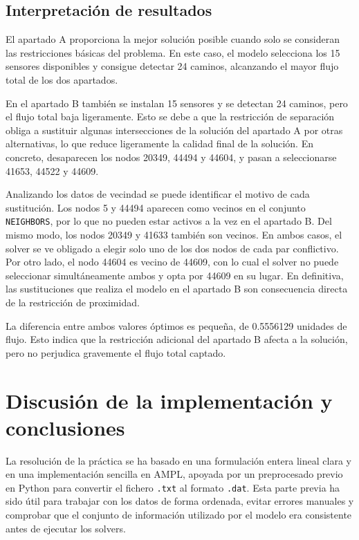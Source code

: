 \documentclass[12pt,a4paper]{article}
\begin{document}
\subsection{Interpretación de resultados}

El apartado A proporciona la mejor solución posible cuando solo se consideran las restricciones básicas del problema. En este caso, el modelo selecciona los 15 sensores disponibles y consigue detectar 24 caminos, alcanzando el mayor flujo total de los dos apartados.

En el apartado B también se instalan 15 sensores y se detectan 24 caminos, pero el flujo total baja ligeramente. Esto se debe a que la restricción de separación obliga a sustituir algunas intersecciones de la solución del apartado A por otras alternativas, lo que reduce ligeramente la calidad final de la solución. En concreto, desaparecen los nodos 20349, 44494 y 44604, y pasan a seleccionarse 41653, 44522 y 44609.

Analizando los datos de vecindad se puede identificar el motivo de cada sustitución. Los nodos 5 y 44494 aparecen como vecinos en el conjunto \texttt{NEIGHBORS}, por lo que no pueden estar activos a la vez en el apartado B. Del mismo modo, los nodos 20349 y 41633 también son vecinos. En ambos casos, el solver se ve obligado a elegir solo uno de los dos nodos de cada par conflictivo. Por otro lado, el nodo 44604 es vecino de 44609, con lo cual el solver no puede seleccionar simultáneamente ambos y opta por 44609 en su lugar. En definitiva, las sustituciones que realiza el modelo en el apartado B son consecuencia directa de la restricción de proximidad.

La diferencia entre ambos valores óptimos es pequeña, de 0.5556129 unidades de flujo. Esto indica que la restricción adicional del apartado B afecta a la solución, pero no perjudica gravemente el flujo total captado.

\section{Discusión de la implementación y conclusiones}

La resolución de la práctica se ha basado en una formulación entera lineal clara y en una implementación sencilla en AMPL, apoyada por un preprocesado previo en Python para convertir el fichero \texttt{.txt} al formato \texttt{.dat}. Esta parte previa ha sido útil para trabajar con los datos de forma ordenada, evitar errores manuales y comprobar que el conjunto de información utilizado por el modelo era consistente antes de ejecutar los solvers.
\end{document}
